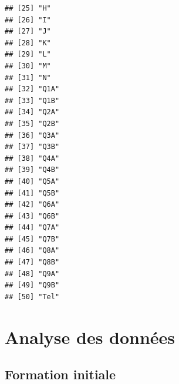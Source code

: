 \documentclass[12pt,english,french]{article}\usepackage{graphicx, color}
\makeatletter
\newenvironment{kframe}{%
 \def\at@end@of@kframe{}%
 \ifinner\ifhmode%
  \def\at@end@of@kframe{\end{minipage}}%
  \begin{minipage}{\columnwidth}%
 \fi\fi%
 \def\FrameCommand##1{\hskip\@totalleftmargin \hskip-\fboxsep
 \colorbox{shadecolor}{##1}\hskip-\fboxsep
     \hskip-\linewidth \hskip-\@totalleftmargin \hskip\columnwidth}%
 \MakeFramed {\advance\hsize-\width
   \@totalleftmargin\z@ \linewidth\hsize
   \@setminipage}}%
 {\par\unskip\endMakeFramed%
 \at@end@of@kframe}
\newenvironment{knitrout}{}{} %
\makeatother
\begin{document}
\begin{knitrout}
\begin{kframe}
\begin{verbatim}
## [25] "H"                                                                  
## [26] "I"                                                                  
## [27] "J"                                                                  
## [28] "K"                                                                  
## [29] "L"                                                                  
## [30] "M"                                                                  
## [31] "N"                                                                  
## [32] "Q1A"                                                                
## [33] "Q1B"                                                                
## [34] "Q2A"                                                                
## [35] "Q2B"                                                                
## [36] "Q3A"                                                                
## [37] "Q3B"                                                                
## [38] "Q4A"                                                                
## [39] "Q4B"                                                                
## [40] "Q5A"                                                                
## [41] "Q5B"                                                                
## [42] "Q6A"                                                                
## [43] "Q6B"                                                                
## [44] "Q7A"                                                                
## [45] "Q7B"                                                                
## [46] "Q8A"                                                                
## [47] "Q8B"                                                                
## [48] "Q9A"                                                                
## [49] "Q9B"                                                                
## [50] "Tel"
\end{verbatim}
\end{kframe}
\end{knitrout}


\section{Analyse des données}

\subsection{Formation initiale}
\end{document}
